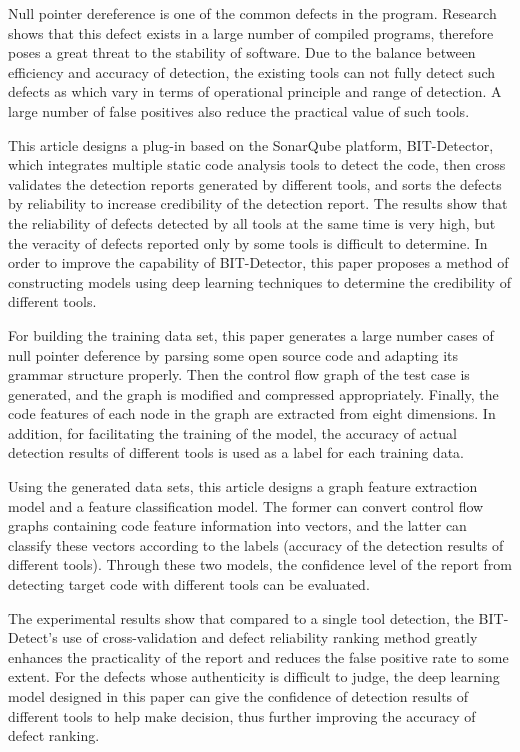 \begin{englishabstract}

   Null pointer dereference is one of the common defects in the program. Research shows that this defect exists in a large number of compiled programs, therefore poses a great threat to the stability of software. Due to the balance between efficiency and accuracy of detection, the existing tools can not fully detect such defects as which vary in terms of operational principle and range of detection. A large number of false positives also reduce the practical value of such tools.
   
   This article designs a plug-in based on the SonarQube platform, BIT-Detector, which integrates multiple static code analysis tools to detect the code, then cross validates the detection reports generated by different tools, and sorts the defects by reliability to increase credibility of the detection report. The results show that the reliability of defects detected by all tools at the same time is very high, but the veracity of defects reported only by some tools is difficult to determine. In order to improve the capability of BIT-Detector, this paper proposes a method of constructing models using deep learning techniques to determine the credibility of different tools.
   
   For building the training data set, this paper generates a large number cases of null pointer deference by parsing some open source code and adapting its grammar structure properly. Then the control flow graph of the test case is generated, and the graph is modified and compressed appropriately. Finally, the code features of each node in the graph are extracted from eight dimensions. In addition, for facilitating the training of the model, the accuracy of actual detection results of different tools is used as a label for each training data.
   
   Using the generated data sets, this article designs a graph feature extraction model and a feature classification model. The former can convert control flow graphs containing code feature information into vectors, and the latter can classify these vectors according to the labels (accuracy of the detection results of different tools). Through these two models, the confidence level of the report from detecting target code with different tools can be evaluated.
   
   The experimental results show that compared to a single tool detection, the BIT-Detect's use of cross-validation and defect reliability ranking method greatly enhances the practicality of the report and reduces the false positive rate to some extent. For the defects whose authenticity is difficult to judge, the deep learning model designed in this paper can give the confidence of detection results of different tools to help make decision, thus further improving the accuracy of defect ranking.
   

\end{englishabstract}
